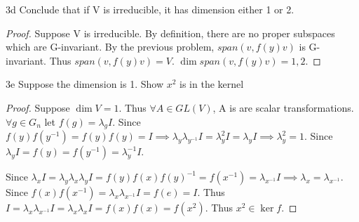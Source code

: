\documentclass{article}
\begin{document}
\begin{claim}{3d}\label{Claim 3d.}
    Conclude that if V is irreducible, it has dimension either 1 or 2.
\end{claim}
\begin{proof}
    Suppose V is irreducible. By definition, there are no proper subspaces which are G-invariant. By the previous problem, $span(v, f(y)v)$ is G-invariant. Thus $span(v, f(y)v) = V$. $\dim span(v, f(y)v) = 1, 2$.      
\end{proof}


\begin{claim}{3e}\label{Claim 3e.}
    Suppose the dimension is 1. Show $x^2$ is in the kernel
\end{claim}
\begin{proof}
    Suppose $\dim V = 1$. Thus $\forall A \in GL(V)$, A is are scalar transformations. $\forall g \in G_n$ let $f(g) = \lambda_g I$. Since $f(y)f(y^{-1}) = f(y)f(y) = I \implies \lambda_y \lambda_{y^{-1}} I = \lambda_y^2 I = \lambda_y I \implies \lambda_y^2 = 1$. Since $\lambda_y  I= f(y) = f(y^{-1}) = \lambda_y^{-1} I$.  
    
    Since $\lambda_x I = \lambda_y \lambda_x \lambda_y I = f(y)f(x)f(y)^{-1} = f(x^{-1}) = \lambda_{x^{-1}} I \implies \lambda_x = \lambda_{x^{-1}}$. Since $f(x)f(x^{-1}) = \lambda_x \lambda_{x^{-1}} I = f(e) = I$. Thus $ I = \lambda_x \lambda_{x^{-1}} I = \lambda_{x} \lambda_{x} I = f(x)f(x) = f(x^2)$. Thus $x^2 \in \ker f$.   
\end{proof}
\end{document}
